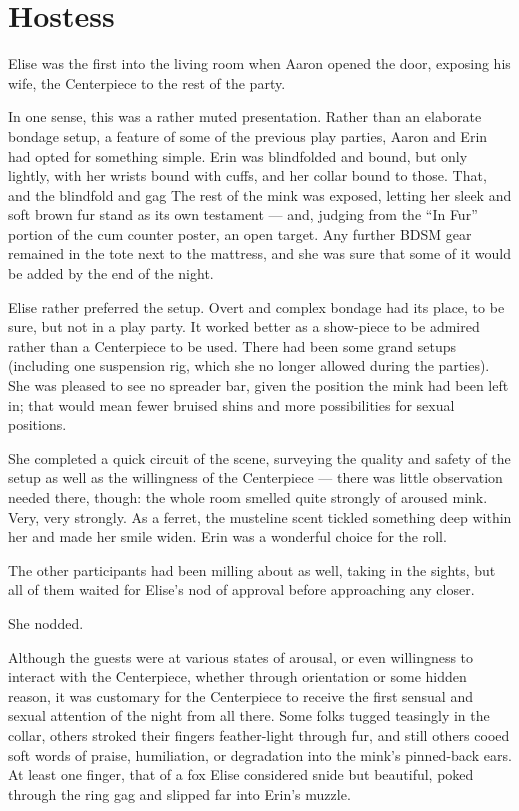 \chapter{Hostess}

Elise was the first into the living room when Aaron opened the door, exposing his wife, the Centerpiece to the rest of the party.

In one sense, this was a rather muted presentation. Rather than an elaborate bondage setup, a feature of some of the previous play parties, Aaron and Erin had opted for something simple. Erin was blindfolded and bound, but only lightly, with her wrists bound with cuffs, and her collar bound to those. That, and the blindfold and gag The rest of the mink was exposed, letting her sleek and soft brown fur stand as its own testament --- and, judging from the ``In Fur'' portion of the cum counter poster, an open target. Any further BDSM gear remained in the tote next to the mattress, and she was sure that some of it would be added by the end of the night.

Elise rather preferred the setup. Overt and complex bondage had its place, to be sure, but not in a play party. It worked better as a show-piece to be admired rather than a Centerpiece to be used. There had been some grand setups (including one suspension rig, which she no longer allowed during the parties). She was pleased to see no spreader bar, given the position the mink had been left in; that would mean fewer bruised shins and more possibilities for sexual positions.

She completed a quick circuit of the scene, surveying the quality and safety of the setup as well as the willingness of the Centerpiece --- there was little observation needed there, though: the whole room smelled quite strongly of aroused mink. Very, very strongly. As a ferret, the musteline scent tickled something deep within her and made her smile widen. Erin was a wonderful choice for the roll.

The other participants had been milling about as well, taking in the sights, but all of them waited for Elise's nod of approval before approaching any closer.

She nodded.

Although the guests were at various states of arousal, or even willingness to interact with the Centerpiece, whether through orientation or some hidden reason, it was customary for the Centerpiece to receive the first sensual and sexual attention of the night from all there. Some folks tugged teasingly in the collar, others stroked their fingers feather-light through fur, and still others cooed soft words of praise, humiliation, or degradation into the mink's pinned-back ears. At least one finger, that of a fox Elise considered snide but beautiful, poked through the ring gag and slipped far into Erin's muzzle.

